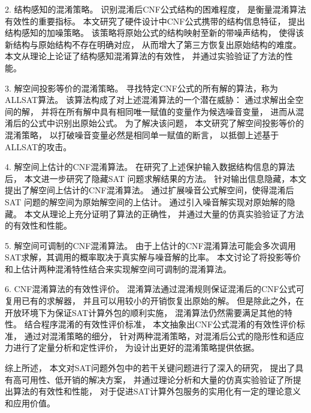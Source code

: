 \begin{cabstract}
2. 结构感知的混淆策略。
识别混淆后CNF公式结构的困难程度，
是衡量混淆算法有效性的重要指标。
本文研究了硬件设计中CNF公式携带的结构信息特征，
提出结构感知的加噪策略。
该策略将原始公式的结构映射至新的带噪声结构，
使得该新结构与原始结构不存在明确对应，
从而增大了第三方恢复出原始结构的难度。
本文从理论上论证了结构感知混淆算法的有效性，
并通过实验验证了方法的性能。

3. 解空间投影等价的混淆策略。
寻找特定CNF公式的所有解的算法，称为ALLSAT算法。
该算法构成了对上述混淆算法的一个潜在威胁：
通过求解出全空间的解，
并将在所有解中具有相同唯一赋值的变量作为候选噪音变量，
进而从混淆后的公式中识别出原始公式。
为了解决该问题，
本文研究了解空间投影等价的混淆策略，
以打破噪音变量必然是相同单一赋值的断言，
以抵御上述基于ALLSAT的攻击。

4. 解空间上估计的CNF混淆算法。
在研究了上述保护输入数据结构信息的算法后，
本文进一步研究了隐藏SAT 问题求解结果的方法。
针对输出信息隐藏，本文提出了解空间上估计的CNF混淆算法。
通过扩展噪音公式解空间，使得混淆后SAT 问题的解空间为原始解空间的上估计。
通过引入噪音解实现对原始解的隐藏。
本文从理论上充分证明了算法的正确性，
并通过大量的仿真实验验证了方法的有效性和性能。

5. 解空间可调制的CNF混淆算法。
由于上估计的CNF混淆算法可能会多次调用SAT求解，其调用的概率取决于真实解与噪音解的比率。
本文讨论了将投影等价和上估计两种混淆特性结合来实现解空间可调制的混淆算法。


6. CNF混淆算法的有效性评价。
混淆算法通过混淆规则保证混淆后的CNF公式可复用已有的求解器，
并且可以用较小的开销恢复出原始的解。
但是除此之外，在开放环境下为保证SAT计算外包的顺利实施，
混淆算法仍然需要满足其他的特性。
结合程序混淆的有效性评价标准，
本文抽象出CNF公式混淆的有效性评价标准，
通过对混淆策略的细分，
针对两种混淆策略，对混淆后公式的隐形性和适应力进行了定量分析和定性评价，
为设计出更好的混淆策略提供依据。

综上所述，
本文对SAT问题外包中的若干关键问题进行了深入的研究，
提出了具有高可用性、低开销的解决方案，
并通过理论分析和大量的仿真实验验证了所提出算法的有效性和性能，
对于促进SAT计算外包服务的实用化有一定的理论意义和应用价值。
\end{cabstract}

